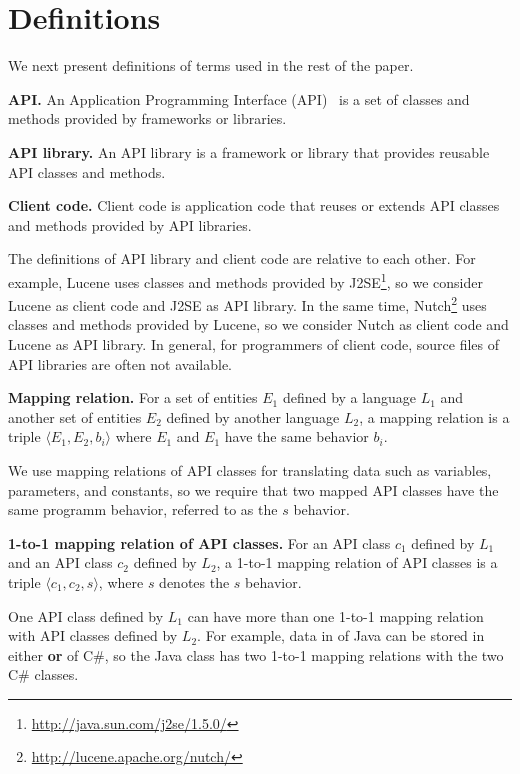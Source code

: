 \section{Definitions}
\label{sec:mapping}

We next present definitions of terms used in the rest of the paper.

\textbf{API.} An Application Programming Interface (API)~\cite{orenstein2000quickstudy}
is a set of classes and methods provided by frameworks or libraries.

\textbf{API library.} An API library is a framework
or library that provides reusable API classes and methods.

\textbf{Client code.} Client code is application code
that reuses or extends API classes and methods provided by API
libraries.

The definitions of API library and client code are
relative to each other. For example, Lucene uses classes and methods provided by
J2SE\footnote{\url{http://java.sun.com/j2se/1.5.0/}}, so we consider Lucene as client code and J2SE as API library. In the same time, Nutch\footnote{\url{http://lucene.apache.org/nutch/}} uses classes and methods provided by Lucene, so we consider Nutch as client code and Lucene as API library. In
general, for programmers of client code, source files of API libraries are often
not available.

\textbf{Mapping relation.} For a set of entities $E_1$ defined by a
language $L_1$ and another set of entities $E_2$ defined by another
language $L_2$, a mapping relation is a triple $\langle E_1, E_2,
b_i \rangle$ where $E_1$ and $E_1$ have the same behavior $b_i$.


We use mapping relations of API classes for translating data such as
variables, parameters, and constants, so we require that two mapped
API classes have the same programm behavior, referred to as
the $s$ behavior.

\textbf{1-to-1 mapping relation of API classes.} For an API class
$c_1$ defined by $L_1$ and an API class $c_2$ defined by $L_2$, a
1-to-1 mapping relation of API classes is a triple $\langle c_1,
c_2, s \rangle$, where $s$ denotes the $s$ behavior.

One API class defined by $L_1$ can have more than one 1-to-1 mapping
relation with API classes defined by $L_2$. For example, data in
 of Java can be stored in either
 \textbf{or}
 of C\#, so the Java class
has two 1-to-1 mapping relations with the two C\# classes.

